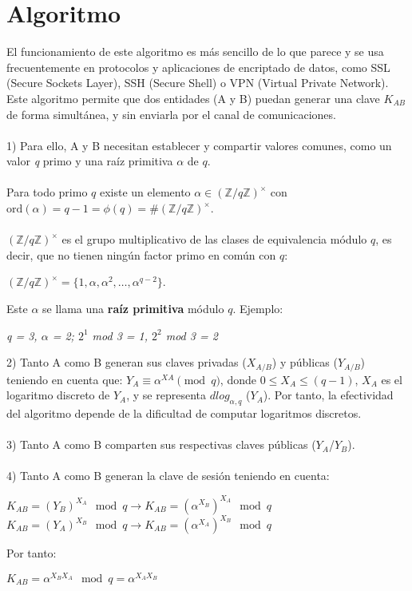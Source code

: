 \documentclass[11pt]{article}
\begin{document}
\section{Algoritmo}
El funcionamiento de este algoritmo es más sencillo de lo que parece y se usa frecuentemente en protocolos y aplicaciones de encriptado de datos, como SSL (Secure Sockets Layer), SSH (Secure Shell) o VPN (Virtual Private Network). Este algoritmo permite que dos entidades (A y B) puedan generar una clave $K_{AB}$ de forma simultánea, y sin enviarla por el canal de comunicaciones. \\\\
1) Para ello, A y B necesitan establecer y compartir valores comunes, como un valor \textit{q} primo y una raíz primitiva $\alpha$  de $q$. \\\\
Para todo primo $q$ existe un elemento $\alpha \in (\mathbb{Z}/q\mathbb{Z})^{\times}$ con $\text{ord}(\alpha) = q - 1 = \phi(q) =  \# (\mathbb{Z}/q\mathbb{Z})^{\times}$. \\\\
$(\mathbb{Z}/q\mathbb{Z})^{\times}$ es el grupo multiplicativo de las clases de equivalencia módulo $q$, es decir, que no tienen ningún factor primo en común con $q$:
\begin{center}
$(\mathbb{Z}/q\mathbb{Z})^{\times} = \{1, \alpha, \alpha^2, \ldots, \alpha^{q-2}\}$.\\
\end{center}
Este $\alpha$ se llama una \textbf{raíz primitiva} módulo $q$. Ejemplo:
\begin{center}
\textit{q = 3, $\alpha$ = 2; $2^1$ mod 3 = 1, $2^2$ mod 3 = 2}
\end{center}
2) Tanto A como B generan sus claves privadas ($X_{A/B}$) y públicas ($Y_{A/B}$) teniendo en cuenta que:  $ Y_{A} \equiv \alpha^{XA} \pmod{q}$, donde $0 \le X_A \le (q-1)$, $X_A$ es el logaritmo discreto de $Y_A$, y se representa $dlog_{\alpha,q}$ ($Y_A$). Por tanto, la efectividad del algoritmo depende de la dificultad de computar logaritmos discretos.
\\\\
3) Tanto A como B comparten sus respectivas claves públicas ($Y_A$/$Y_B$).
\\\\
4) Tanto A como B generan la clave de sesión teniendo en cuenta: 
\begin{center}
$K_{AB} = (Y_B)^{X_A} \mod q \rightarrow K_{AB} = (\alpha^{X_B})^{X_A} \mod q$  \\
$K_{AB} = (Y_A)^{X_B} \mod q \rightarrow K_{AB} = (\alpha^{X_A})^{X_B} \mod q$  \\
\end{center}
Por tanto:
\begin{center}
$K_{AB} = \alpha^{X_B X_A} \mod q = \alpha^{X_A X_B}$
\end{center}
\end{document}
